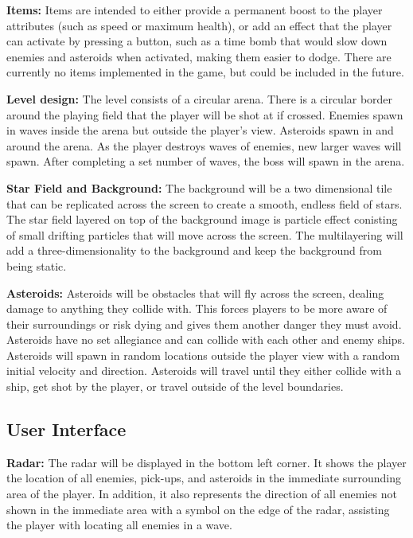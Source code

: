 \documentclass[12pt]{article}       %
\begin{document}
	{\bf  Items:} Items are intended to either provide a permanent boost to the player attributes (such as speed or maximum health), or add an effect that the player can activate by pressing a button, such as a time bomb that would slow down enemies and asteroids when activated, making them easier to dodge. There are currently no items implemented in the game, but could be included in the future. 

	{\bf Level design:} The level consists of a circular arena. There is a circular border around the playing field that the player will be shot at if crossed. Enemies spawn in waves inside the arena but outside the player's view. Asteroids spawn in and around the arena. As the player destroys waves of enemies, new larger waves will spawn. After completing a set number of waves, the boss will spawn in the arena.

	{\bf Star Field and Background:} The background will be a two dimensional tile that can be replicated across the screen to create a smooth, endless field of stars. The star field layered on top of the background image is particle effect conisting of small drifting particles that will move across the screen. The multilayering will add a three-dimensionality to the background and keep the background from being static.

	{\bf Asteroids:}  Asteroids will be obstacles that will fly across the screen, dealing damage to anything they collide with. This forces players to be more aware of their surroundings or risk dying and gives them another danger they must avoid. Asteroids have no set allegiance and can collide with each other and enemy ships. Asteroids will spawn in random locations outside the player view with a random initial velocity and direction. Asteroids will travel until they either collide with a ship, get shot by the player, or travel outside of the level boundaries.

\subsection{User Interface} %

	{\bf Radar:} The radar will be displayed in the bottom left corner. It shows the player the location of all enemies, pick-ups, and asteroids in the immediate surrounding area of the player. In addition, it also represents the direction of all enemies not shown in the immediate area with a symbol on the edge of the radar, assisting the player with locating all enemies in a wave.
\end{document}
